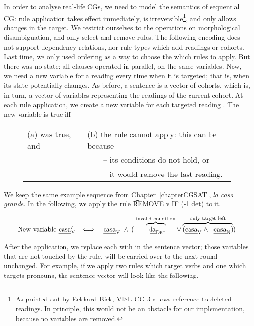 In order to analyse real-life CGs, we need to model the semantics of sequential CG:
rule application takes effect immediately, is irreversible\footnote{As pointed out by Eckhard Bick, VISL CG-3 allows reference to deleted readings. In principle, this would not be an obstacle for our implementation, because no variables are removed.}, and only allows changes in the target.
We restrict ourselves to the operations on morphological disambiguation, and only {\sc select} and {\sc remove} rules.
The following encoding does not support dependency relations, nor rule types which add readings or cohorts.
Last time, we only used ordering as a way to choose the which rules to apply.
But there was no state: all clauses operated in parallel, on the same variables.
Now, we need a new variable for a reading every time when it is targeted;
that is, when its state potentially changes.
As before, a sentence is a vector of cohorts, which is, in turn, a vector of variables representing the readings of the current cohort.
At each rule application, we create a new variable \newVar{} for each targeted reading \oldVar{}.
The new variable \newVar{} is true iff

\begin{figure}[h]
\begin{tabular}{l l}
(a) \oldVar{} was true, and
                             & (b) the rule cannot apply: this can be because \\
                                     & ~~~~-- its conditions do not hold, or \\
                                     & ~~~~-- it would remove the last reading.
\end{tabular}
\end{figure}

\noindent We keep the same example sequence from Chapter~\ref{chapterCGSAT}, {\em la casa grande}. In the following, we apply the rule \t{REMOVE v IF (-1 det)} to it.

$$\begin{array}{r l}
\text{New variable } \casa{}'_\v
      & \Longleftrightarrow \quad \casaV\
        \wedge\: ( \; \ob{\neg\laDet}^{\invConds}
        \vee  \ob{(\casaV \wedge \neg \casaN) }^{\onlyTrgLeft} ) \\
\end{array}$$


\noindent After the application, we replace each \oldVar with \newVar in the sentence vector; those variables that are not touched by the rule, will be carried over to the next round unchanged.
For example, if we apply two rules which target verbs and one which targets pronouns,
the sentence vector will look like the following.


